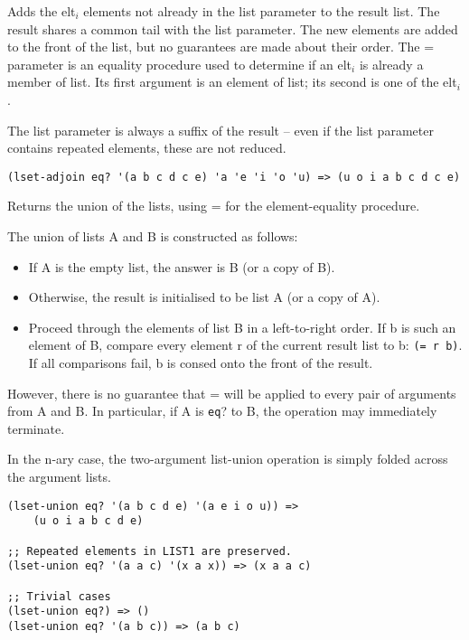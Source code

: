 \begin{entry}{%
  }

  Adds the elt$_i$ elements not already in the list parameter
  to the result list. The result shares a common tail with the list
  parameter. The new elements are added to the front of the list, but
  no guarantees are made about their order. The = parameter is an
  equality procedure used to determine if an elt$_i$ is already a
  member of list. Its first argument is an element of list; its second
  is one of the elt$_i$.

  The list parameter is always a suffix of the result -- even if the
  list parameter contains repeated elements, these are not reduced.

\begin{verbatim}
(lset-adjoin eq? '(a b c d c e) 'a 'e 'i 'o 'u) => (u o i a b c d c e)
\end{verbatim}
\end{entry}


\begin{entry}{%
  }

  Returns the union of the lists, using = for the element-equality
  procedure.

  The union of lists A and B is constructed as follows:

\begin{itemize}
  \tightlist
\item If A is the empty list, the answer is B (or a copy of B).
\item Otherwise, the result is initialised to be list A (or a copy of
  A).
\item Proceed through the elements of list B in a left-to-right
  order. If b is such an element of B, compare every element r of the
  current result list to b: \texttt{(=\ r\ b)}. If all comparisons
  fail, b is consed onto the front of the result.
\end{itemize}

However, there is no guarantee that = will be applied to every pair of
arguments from A and B. In particular, if A is \texttt{eq}? to B, the
operation may immediately terminate.

In the n-ary case, the two-argument list-union operation is simply
folded across the argument lists.

\begin{verbatim}
(lset-union eq? '(a b c d e) '(a e i o u)) => 
    (u o i a b c d e)

;; Repeated elements in LIST1 are preserved.
(lset-union eq? '(a a c) '(x a x)) => (x a a c)

;; Trivial cases
(lset-union eq?) => ()
(lset-union eq? '(a b c)) => (a b c)
\end{verbatim}
\end{entry}

